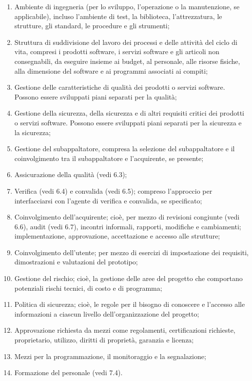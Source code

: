 \begin{itemize}
\begin{enumerate}
                \item Ambiente di ingegneria (per lo sviluppo, l’operazione o la manutenzione, se applicabile), incluso l’ambiente di test, la biblioteca, l’attrezzatura, le strutture, gli standard, le procedure e gli strumenti;
                \item Struttura di suddivisione del lavoro dei processi e delle attività del ciclo di vita, compresi i prodotti software, i servizi software e gli articoli non consegnabili, da eseguire insieme ai budget, al personale, alle risorse fisiche, alla dimensione del software e ai programmi associati ai compiti;
                \item Gestione delle caratteristiche di qualità dei prodotti o servizi software. Possono essere sviluppati piani separati per la qualità;
                \item Gestione della sicurezza, della sicurezza e di altri requisiti critici dei prodotti o servizi software. Possono essere sviluppati piani separati per la sicurezza e la sicurezza;
                \item Gestione del subappaltatore, compresa la selezione del subappaltatore e il coinvolgimento tra il subappaltatore e l’acquirente, se presente;
                \item Assicurazione della qualità (vedi 6.3);
                \item Verifica (vedi 6.4) e convalida (vedi 6.5); compreso l’approccio per interfacciarsi con l’agente di verifica e convalida, se specificato;
                \item Coinvolgimento dell’acquirente; cioè, per mezzo di revisioni congiunte (vedi 6.6), audit (vedi 6.7), incontri informali, rapporti, modifiche e cambiamenti; implementazione, approvazione, accettazione e accesso alle strutture;
                \item Coinvolgimento dell’utente; per mezzo di esercizi di impostazione dei requisiti, dimostrazioni e valutazioni del prototipo;
                \item Gestione del rischio; cioè, la gestione delle aree del progetto che comportano potenziali rischi tecnici, di costo e di programma;
                \item Politica di sicurezza; cioè, le regole per il bisogno di conoscere e l’accesso alle informazioni a ciascun livello dell’organizzazione del progetto;
                \item Approvazione richiesta da mezzi come regolamenti, certificazioni richieste, proprietario, utilizzo, diritti di proprietà, garanzia e licenza;
                \item Mezzi per la programmazione, il monitoraggio e la segnalazione;
                \item Formazione del personale (vedi 7.4).
            \end{enumerate}
        \end{itemize}

